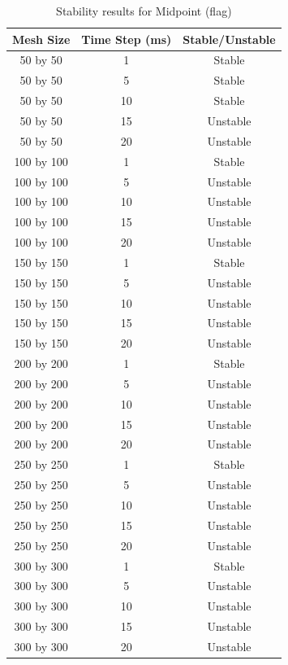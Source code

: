 \begin{table}[tp]
   \begin{minipage}{\textwidth}
      \begin{center}
         \begin{tabular}{|c|c|c|} \hline
           Mesh Size & Time Step (ms) & Stable/Unstable\\
           \hline
           50 by 50 & 1 & Stable\\ \hline
           50 by 50 & 5 & Stable\\ \hline
           50 by 50 & 10 & Stable\\ \hline
           50 by 50 & 15 & Unstable\\ \hline
           50 by 50 & 20 & Unstable\\ \hline
           100 by 100 & 1 & Stable\\ \hline
           100 by 100 & 5 & Unstable\\ \hline
           100 by 100 & 10 & Unstable\\ \hline
           100 by 100 & 15 & Unstable\\ \hline
           100 by 100 & 20 & Unstable\\ \hline           
           150 by 150 & 1 & Stable\\ \hline
           150 by 150 & 5 & Unstable\\ \hline
           150 by 150 & 10 & Unstable\\ \hline
           150 by 150 & 15 & Unstable\\ \hline
           150 by 150 & 20 & Unstable\\ \hline           
           200 by 200 & 1 & Stable\\ \hline
           200 by 200 & 5 & Unstable\\ \hline
           200 by 200 & 10 & Unstable\\ \hline
           200 by 200 & 15 & Unstable\\ \hline
           200 by 200 & 20 & Unstable\\ \hline           
           250 by 250 & 1 & Stable\\ \hline
           250 by 250 & 5 & Unstable\\ \hline
           250 by 250 & 10 & Unstable\\ \hline
           250 by 250 & 15 & Unstable\\ \hline
           250 by 250 & 20 & Unstable\\ \hline           
           300 by 300 & 1 & Stable\\ \hline
           300 by 300 & 5 & Unstable\\ \hline
           300 by 300 & 10 & Unstable\\ \hline
           300 by 300 & 15 & Unstable\\ \hline
           300 by 300 & 20 & Unstable\\ \hline
         \end{tabular}
      \end{center}
   \end{minipage}
   \caption{Stability results for Midpoint (flag)}
   \label{tab:m stability flag}
\end{table}

